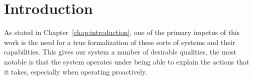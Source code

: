 \section{Introduction}

As stated in Chapter~\ref{chap:introduction}, one of the primary impetus
of this work is the need for a true formalization of these sorts of
systems and their capabilities. This gives our system a number of
desirable qualities, the most notable is that the system operates under
being able to explain the actions that it takes, especially when operating
proactively.